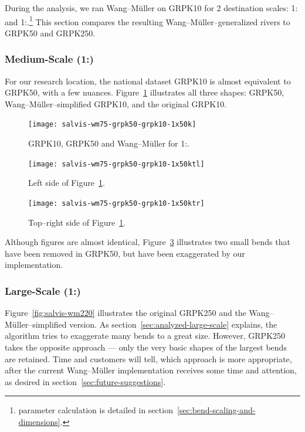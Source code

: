 \documentclass[a4paper]{article}
\newcommand{\WM}{Wang--M{\"u}ller}
\begin{document}
During the analysis, we ran {\WM} on GRPK10 for 2 destination scales:
1: and 1:.\footnote{parameter calculation is
detailed in section~\ref{sec:bend-scaling-and-dimensions}.} This section
compares the resulting {\WM}--generalized rivers to GRPK50 and GRPK250.

\subsubsection{Medium-Scale (1:)}

For our research location, the national dataset GRPK10 is almost equivalent to
GRPK50, with a few nuances. Figure~\ref{fig:salvis-wm75-grpk50-grpk10-1x50k}
illustrates all three shapes: GRPK50, {\WM}--simplified GRPK10, and the
original GRPK10.

\begin{figure}[h!]
    \centering
    \texttt{[image: salvis-wm75-grpk50-grpk10-1x50k]}

    \caption{GRPK10, GRPK50 and {\WM} for 1:.}

    \label{fig:salvis-wm75-grpk50-grpk10-1x50k}
\end{figure}

\begin{figure}[h!]
    \centering
    \texttt{[image: salvis-wm75-grpk50-grpk10-1x50ktl]}
    \caption{Left side of Figure~\ref{fig:salvis-wm75-grpk50-grpk10-1x50k}.}
    \label{fig:salvis-wm75-grpk50-grpk10-1x50ktl}
\end{figure}

\begin{figure}[h!]
    \centering
    \texttt{[image: salvis-wm75-grpk50-grpk10-1x50ktr]}
    \caption{Top--right side of Figure~\ref{fig:salvis-wm75-grpk50-grpk10-1x50k}.}
    \label{fig:salvis-wm75-grpk50-grpk10-1x50ktr}
\end{figure}

Although figures are almost identical,
Figure~\ref{fig:salvis-wm75-grpk50-grpk10-1x50ktr} illustrates two small bends
that have been removed in GRPK50, but have been exaggerated by our
implementation.

\clearpage

\subsubsection{Large-Scale (1:)}
\label{sec:national-large-scale}

Figure~\ref{fig:salvis-wm220} illustrates the original GRPK250 and the
{\WM}--simplified version. As section~\ref{sec:analyzed-large-scale} explains,
the algorithm tries to exaggerate many bends to a great size. However, GRPK250
takes the opposite approach --- only the very basic shapes of the largest bends
are retained. Time and customers will tell, which approach is more appropriate,
after the current {\WM} implementation receives some time and attention, as
desired in section~\ref{sec:future-suggestions}.
\end{document}
